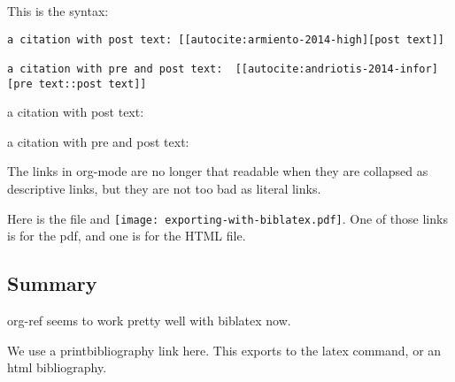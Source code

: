 \documentclass{article}
\begin{document}
This is the syntax:
\begin{verbatim}
a citation with post text: [[autocite:armiento-2014-high][post text]]

a citation with pre and post text:  [[autocite:andriotis-2014-infor][pre text::post text]]
\end{verbatim}
a citation with post text: \autocite[post text]{armiento-2014-high}

a citation with pre and post text:  \autocite[pre text][post text]{andriotis-2014-infor}

The links in org-mode are no longer that readable when they are collapsed as descriptive links, but they are not too bad as literal links. 

Here is the file  and \texttt{[image: exporting-with-biblatex.pdf]}. One of those links is for the pdf, and one is for the HTML file.

\subsection{Summary}
\label{sec-1-2}
org-ref seems to work pretty well with biblatex now. 

We use a printbibliography link here. This exports to the latex command, or an html bibliography.
\printbibliography
\end{document}
